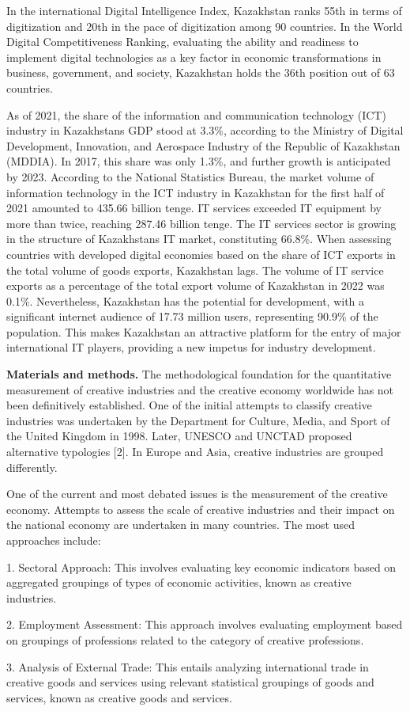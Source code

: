 \begin{multicols}{2}
In the international Digital Intelligence Index, Kazakhstan ranks 55th
in terms of digitization and 20th in the pace of digitization among 90
countries. In the World Digital Competitiveness Ranking, evaluating the
ability and readiness to implement digital technologies as a key factor
in economic transformations in business, government, and society,
Kazakhstan holds the 36th position out of 63 countries.

As of 2021, the share of the information and communication technology
(ICT) industry in Kazakhstan\textquotesingle s GDP stood at 3.3\%,
according to the Ministry of Digital Development, Innovation, and
Aerospace Industry of the Republic of Kazakhstan (MDDIA). In 2017, this
share was only 1.3\%, and further growth is anticipated by 2023.
According to the National Statistics Bureau, the market volume of
information technology in the ICT industry in Kazakhstan for the first
half of 2021 amounted to 435.66 billion tenge. IT services exceeded IT
equipment by more than twice, reaching 287.46 billion tenge. The IT
services sector is growing in the structure of
Kazakhstan\textquotesingle s IT market, constituting 66.8\%. When
assessing countries with developed digital economies based on the share
of ICT exports in the total volume of goods exports, Kazakhstan lags.
The volume of IT service exports as a percentage of the total export
volume of Kazakhstan in 2022 was 0.1\%. Nevertheless, Kazakhstan has the
potential for development, with a significant internet audience of 17.73
million users, representing 90.9\% of the population. This makes
Kazakhstan an attractive platform for the entry of major international
IT players, providing a new impetus for industry development.

{\bfseries Materials and methods.} The methodological foundation for the
quantitative measurement of creative industries and the creative economy
worldwide has not been definitively established. One of the initial
attempts to classify creative industries was undertaken by the
Department for Culture, Media, and Sport of the United Kingdom in 1998.
Later, UNESCO and UNCTAD proposed alternative typologies {[}2{]}. In
Europe and Asia, creative industries are grouped differently.

One of the current and most debated issues is the measurement of the
creative economy. Attempts to assess the scale of creative industries
and their impact on the national economy are undertaken in many
countries. The most used approaches include:

1. Sectoral Approach: This involves evaluating key economic indicators
based on aggregated groupings of types of economic activities, known as
creative industries.

2. Employment Assessment: This approach involves evaluating employment
based on groupings of professions related to the category of creative
professions.

3. Analysis of External Trade: This entails analyzing international
trade in creative goods and services using relevant statistical
groupings of goods and services, known as creative goods and services.
\end{multicols}

